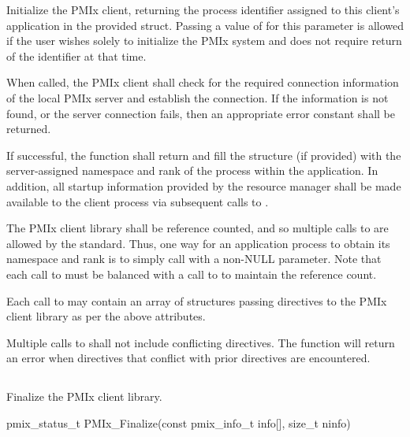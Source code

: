 \descr

Initialize the \ac{PMIx} client, returning the process identifier assigned to this client's application in the provided  struct.
Passing a value of  for this parameter is allowed if the user wishes solely to initialize the \ac{PMIx} system and does not require return of the identifier at that time.

When called, the \ac{PMIx} client shall check for the required connection information of the local \ac{PMIx} server and establish the connection.
If the information is not found, or the server connection fails, then an appropriate error constant shall be returned.

If successful, the function shall return  and fill the  structure (if provided) with the server-assigned namespace and rank of the process within the application.
In addition, all startup information provided by the resource manager shall be made available to the client process via subsequent calls to .

The \ac{PMIx} client library shall be reference counted, and so multiple calls to  are allowed by the standard.
Thus, one way for an application process to obtain its namespace and rank is to simply call  with a non-NULL  parameter.
Note that each call to  must be balanced with a call to  to maintain the reference count.

Each call to  may contain an array of  structures passing directives to the \ac{PMIx} client library as per the above attributes.

Multiple calls to  shall not include conflicting directives.
The  function will return an error when directives that conflict with prior directives are encountered.


\subsection{}

\summary

Finalize the PMIx client library.

\format

\cspecificstart
\begin{codepar}
pmix_status_t
PMIx_Finalize(const pmix_info_t info[], size_t ninfo)
\end{codepar}
\cspecificend

